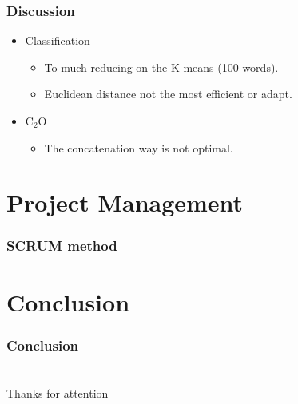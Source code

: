 \documentclass[xcolor=table]{beamer}
\begin{document}

\begin{frame} \frametitle{Discussion}

\begin{itemize}
    \item Classification
    \vspace{0.3cm}
    \begin{itemize}
        \item To much reducing on the K-means (100 words).
        \vspace{0.15cm}
        \item Euclidean distance not the most efficient or adapt.
    \end{itemize}
    \vspace{0.7cm}
    \item C$_2$O
    \vspace{0.3cm}
    \begin{itemize}
        \item The concatenation way is not optimal.
    \end{itemize}
\end{itemize}
\end{frame}

\section{Project Management}
\begin{frame} \frametitle{SCRUM method}

\end{frame}

\section{Conclusion}
\begin{frame} \frametitle{Conclusion}

\end{frame}


\section{}
\begin{frame} \frametitle{}
    \begin{center}
        Thanks for attention
    \end{center}
\end{frame}
\end{document}
